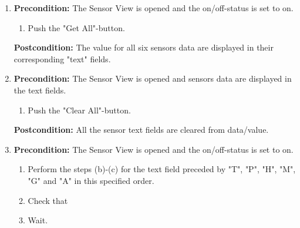 \documentclass[a4paper]{article}
\newlength{\testlabellength}
\newenvironment{testlist}{\begin{enumerate}[label=\bfseries Instruction \thesubsection.\arabic* , labelindent=0pt, labelwidth=\testlabellength , leftmargin=2cm]}{\end{enumerate}}
\begin{document}
\begin{appendices}
\begin{testlist}
\begin{enumerate}
    			
    			\end{enumerate}
    			\textbf{Postcondition:} The values of the temperature, pressure, humidity, magnetic field strength, qyroscopic and acceleration sensors are retrieved if available and displayed.


 \item \vspace{5mm} \textbf{Precondition:} The Sensor View is opened and the on/off-status is set to on. 
    			\begin{enumerate}
    				\item Push the "Get All"-button.
    			
    			
    			\end{enumerate}
    			\textbf{Postcondition:} The value for all six sensors data are displayed in their corresponding "text" fields.

 \item \vspace{5mm} \textbf{Precondition:} The Sensor View is opened and sensors data are displayed in the text fields.
    			\begin{enumerate}
    				\item Push the "Clear All"-button.
    			
    			\end{enumerate}
    			\textbf{Postcondition:} All the sensor text fields are cleared from data/value.

 \item \vspace{5mm} \textbf{Precondition:} The Sensor View is opened and the on/off-status is set to on. 
    			\begin{enumerate}
    				\item Perform the steps (b)-(c) for the text field preceded by "T", "P", "H", "M", "G" and "A" in this specified order.
    				\item Check that 
	    			\item Wait.
    			

\end{enumerate}
\end{testlist}
\end{appendices}
\end{document}
